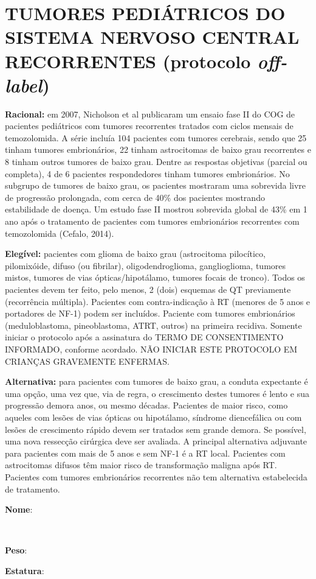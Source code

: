 \documentclass[11pt,a4paper,oldfontcommands]{memoir}
\def\entrywithlabel[#1]#2{\parbox{#1}{{\small #2:} \hrulefill}}
\begin{document}
\section{TUMORES PEDIÁTRICOS DO SISTEMA NERVOSO CENTRAL RECORRENTES (protocolo \textit{off-label})}
{\let\thefootnote\relax{}}
\textbf{Racional:} em 2007, Nicholson et al publicaram um ensaio fase II do COG de pacientes pediátricos com tumores recorrentes tratados com ciclos mensais de temozolomida. A série incluía 104 pacientes com tumores cerebrais, sendo que 25 tinham tumores embrionários, 22 tinham astrocitomas de baixo grau recorrentes e 8 tinham outros tumores de baixo grau. Dentre as respostas objetivas (parcial ou completa), 4 de 6 pacientes respondedores tinham tumores embrionários. No subgrupo de tumores de baixo grau, os pacientes mostraram uma sobrevida livre de progressão prolongada, com cerca de 40\% dos pacientes mostrando estabilidade de doença. Um estudo fase II mostrou sobrevida global de 43\% em 1 ano após o tratamento de pacientes com tumores embrionários recorrentes com temozolomida (Cefalo, 2014).

\textbf{Elegível:} pacientes com glioma de baixo grau (astrocitoma pilocítico, pilomixóide, difuso (ou fibrilar), oligodendroglioma, ganglioglioma, tumores mistos, tumores de vias ópticas/hipotálamo, tumores focais de tronco). Todos os pacientes devem ter feito, pelo menos, 2 (dois) esquemas de QT previamente (recorrência múltipla). Pacientes com contra-indicação à RT (menores de 5 anos e portadores de NF-1) podem ser incluídos. Paciente com tumores embrionários (meduloblastoma, pineoblastoma, ATRT, outros) na primeira recidiva. Somente iniciar o protocolo após a assinatura do TERMO DE CONSENTIMENTO INFORMADO, conforme acordado. NÃO INICIAR ESTE PROTOCOLO EM CRIANÇAS GRAVEMENTE ENFERMAS.

\textbf{Alternativa:} para pacientes com tumores de baixo grau, a conduta expectante é uma opção, uma vez que, via de regra, o crescimento destes tumores é lento e sua progressão demora anos, ou mesmo décadas. Pacientes de maior risco, como aqueles com lesões de vias ópticas ou hipotálamo, síndrome diencefálica ou com lesões de crescimento rápido devem ser tratados sem grande demora. Se possível, uma nova ressecção cirúrgica deve ser avaliada. A principal alternativa adjuvante para pacientes com mais de 5 anos e sem NF-1 é a RT local. Pacientes com astrocitomas difusos têm maior risco de transformação maligna após RT. Pacientes com tumores embrionários recorrentes não tem alternativa estabelecida de tratamento.
\\[0.4cm]
\entrywithlabel[1\hsize]{\textbf{Nome}}\hfill
\\[0.3cm]
\entrywithlabel[.45\hsize]{\textbf{Peso}}\hfill  \entrywithlabel[.45\hsize]{\textbf{Estatura}}
\end{document}
